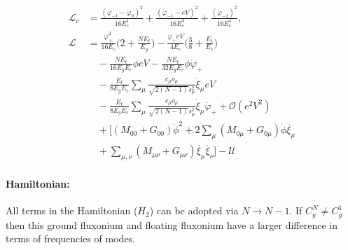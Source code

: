 \documentclass[prx,showpacs,notitlepage,twocolumn,superscriptaddress,nofootinbib,preprintnumbers,floatfix]{revtex4-2}
\begin{document}
\begin{align}
    \mathcal{L}_{c}&=\frac{(\dot{\varphi}_{-1}-\dot{\varphi}_{0})^2}{16E^1_{c}}+\frac{(\dot{\varphi}_{-1}-eV)^2}{16E^3_{c}}+\frac{(\dot{\varphi}_{-2})^2}{16E^4_{c}},\\
 \mathcal{L}&=\frac{\dot{\varphi}_{+}^2}{16E_c}\Big(2+\frac{NE_t}{E_g}\Big)-\frac{\dot{\varphi}_{+}eV}{4E_c}\Big(\frac{3}{8}+\frac{E_t}{E_c}\Big)\nonumber\\
    &\quad-\frac{NE_t}{16E_gE_c}\dot{\phi}eV-\frac{NE_t}{32E_gE_c}\dot{\phi}\dot{\varphi}_{+}\\
    &\quad -\frac{E_t}{8E_gE_c} \sum_\mu\frac{c_\mu o_\mu}{\sqrt{2(N-1)}s_\mu^2}  \dot{\xi}_\mu eV\nonumber\\
    &\quad-\frac{E_t}{8E_gE_c} \sum_\mu\frac{c_\mu o_\mu}{\sqrt{2(N-1)}s_\mu^2}  \dot{\xi}_\mu\dot{\varphi}_{+}+\mathcal{O}(e^2V^2)\\
    &\quad+\Big[(M_{00}+G_{00})\dot{\phi}^2+2\sum_{\mu}(M_{0\mu}+G_{0\mu})\dot{\phi}\dot{\xi_\mu}\nonumber\\
    &\quad+\sum_{\mu,\nu}(M_{\mu\nu}+G_{\mu\nu})\dot{\xi_\mu}\dot{\xi_\nu}\Big]-\mathcal{U}
\end{align}

\paragraph{Hamiltonian:} All terms in the Hamiltonian ($H_2$) can be adopted via $N\rightarrow N-1$. If $C_g^N\neq C_g^1$ then this ground fluxonium and floating fluxonium have a larger difference in terms of frequencies of modes.
 
\end{document}
